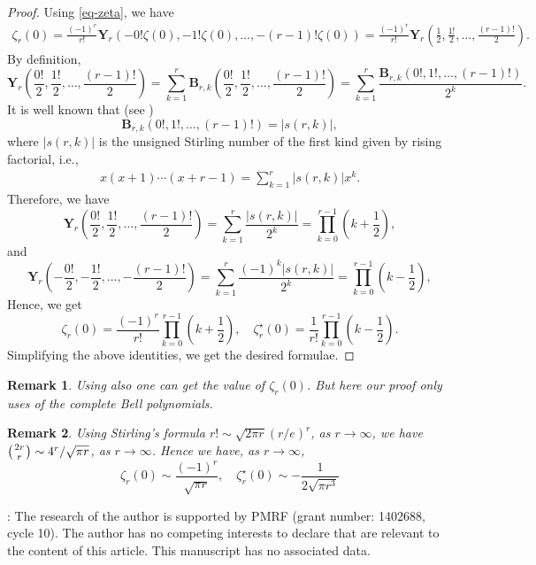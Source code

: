 \documentclass[12pt]{amsart}
\newtheorem{rmk}{Remark}
\begin{document}
\begin{proof}
Using \eqref{eq-zeta}, we have
\begin{align*}
\zeta_{r}(0)=\frac{(-1)^r}{r!}{\mathbf{Y}_r\left(-0!\zeta(0), -1!\zeta(0),\ldots,-(r-1)!\zeta(0)\right)}
=\frac{(-1)^r}{r!}\mathbf{Y}_r\left(\frac{1}{2}, \frac{1!}{2}, \ldots, \frac{(r-1)!}{2}\right).
\end{align*}
By definition,
$$
\mathbf{Y}_r\left(\frac{0!}{2}, \frac{1!}{2}, \ldots, \frac{(r-1)!}{2}\right)=\sum_{k=1}^{r}\mathbf{B}_{r,k}\left(\frac{0!}{2}, \frac{1!}{2},\ldots, \frac{(r-1)!}{2}\right)=\sum_{k=1}^{r}\frac{\mathbf{B}_{r,k}\left({0!}, {1!},\ldots, {(r-1)!}\right)}{2^k}.
$$
It is well known that (see \cite[Chapter 5]{L})
$$
\mathbf{B}_{r,k}\left({0!}, {1!},\ldots, {(r-1)!}\right)=|s(r,k)|,
$$
where $|s(r,k)|$ is the unsigned Stirling number of the first kind given by rising factorial, i.e.,
\begin{align}\label{gen-stirling}
x\left(x+1\right)\cdots \left(x+r-1\right)=\sum_{k=1}^{r}{|s(r,k)|}{x^k}.
\end{align}
Therefore, we have
$$
\mathbf{Y}_r\left(\frac{0!}{2}, \frac{1!}{2}, \ldots, \frac{(r-1)!}{2}\right)=\sum_{k=1}^{r}\frac{|s(r,k)|}{2^k}=\prod_{k=0}^{r-1}\left(k+\frac{1}{2}\right),
$$
and
$$
\mathbf{Y}_r\left(-\frac{0!}{2}, -\frac{1!}{2}, \ldots, -\frac{(r-1)!}{2}\right)=\sum_{k=1}^{r}\frac{(-1)^k|s(r,k)|}{2^k}=\prod_{k=0}^{r-1}\left(k-\frac{1}{2}\right),
$$
Hence, we get
$$
\zeta_r(0)=\frac{(-1)^r}{r!}\prod_{k=0}^{r-1}\left(k+\frac{1}{2}\right), \quad \zeta^{\star}_r(0)=\frac{1}{r!}\prod_{k=0}^{r-1}\left(k-\frac{1}{2}\right).
$$
Simplifying the above identities, we get the desired formulae.
\end{proof}
\begin{rmk}\label{asym-at-zero} \rm 
Using \cite[Corollary 2]{K} also one can get the value of $\zeta_r(0)$. But here our proof only uses of the complete Bell polynomials. 
\end{rmk}
\begin{rmk}\rm  Using Stirling's formula
$r! \sim \sqrt{2\pi r} \left( r/e \right)^r$,
as $r\rightarrow\infty$, we have $\left(2r \atop r \right) \sim 4^r/\sqrt{\pi r}$, as $r\rightarrow\infty$. Hence we have, as $r\rightarrow\infty$,
$$
\zeta_r(0)\sim\frac{(-1)^r}{\sqrt{\pi r}}, \quad \zeta^\star_r(0)\sim-\frac{1}{2\sqrt{\pi r^3}}
$$
\end{rmk}

:
The research of the author is supported by PMRF (grant number: 1402688, cycle 10). The author has no competing interests to declare that are relevant to the content of this article. This manuscript has no associated data.
\end{document}
